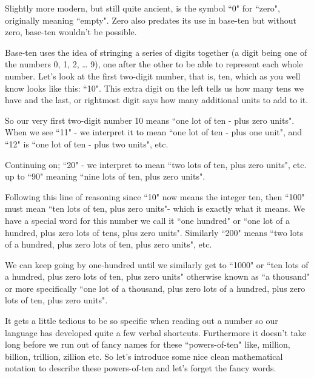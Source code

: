 \documentclass{article}
\begin{document}
Slightly more modern, but still quite ancient,
is the symbol ``0" for ``zero", originally meaning ``empty".
Zero also predates its use in base-ten but without zero,
base-ten wouldn't be possible.

Base-ten uses the idea of stringing a series of digits together
(a digit being one of the numbers 0, 1, 2, \dots{} 9),
one after the other to be able to represent each whole number.
Let's look at the first two-digit number, that is, ten,
which as you well know looks like this: ``10".
This extra digit on the left tells us how many tens we have and the last,
or rightmost digit says how many additional units to add to it.

So our very first two-digit number 10 means ``one lot of ten - plus zero units".
When we see ``11" - we interpret it to mean ``one lot of ten - plus one unit",
and ``12" is ``one lot of ten - plus two units", etc.

Continuing on; ``20" - we interpret to mean ``two lots of ten,
plus zero units", etc. up to ``90" meaning ``nine lots of ten,
plus zero units".

Following this line of reasoning since ``10" now means the integer ten,
then ``100" must mean ``ten lots of ten,
plus zero units"- which is exactly what it means.
We have a special word for this number we call it ``one hundred" or ``one lot of a hundred,
plus zero lots of tens, plus zero units".
Similarly ``200" means ``two lots of a hundred, plus zero lots of ten,
plus zero units", etc.

We can keep going by one-hundred until we similarly get to ``1000" or ``ten lots of a hundred,
plus zero lots of ten, plus zero units" otherwise known
as ``a thousand" or more specifically ``one lot of a thousand,
plus zero lots of a hundred, plus zero lots of ten, plus zero units".

It gets a little tedious to be so specific when reading out
a number so our language has developed quite a few verbal shortcuts.
Furthermore it doesn't take long before we run out of fancy names
for these ``powers-of-ten" like, million, billion, trillion,
zillion etc. So let's introduce some nice clean mathematical notation
to describe these powers-of-ten and let's forget the fancy words.
\end{document}
